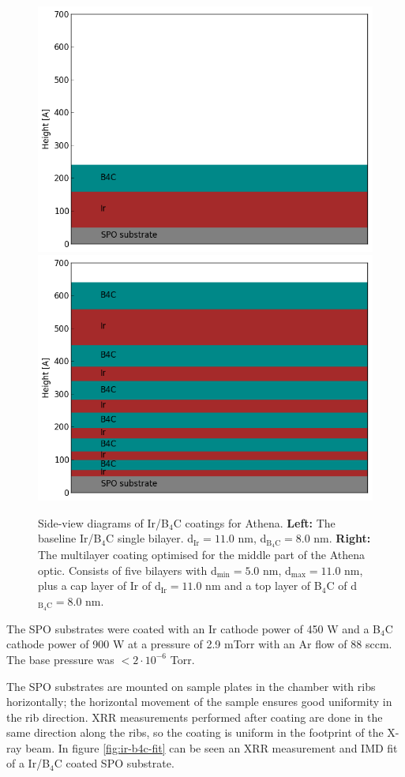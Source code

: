 \begin{figure}[!h]
  \center
\includegraphics[width=0.4\linewidth]{figures/athena/coating_on_spo/ir-b4c-baseline.png}
  \includegraphics[width=0.4\linewidth]{figures/athena/coating_on_spo/ir-b4c-ml.png}
\caption{\footnotesize Side-view diagrams of Ir/B$_4$C coatings for Athena. \textbf{Left:} The baseline Ir/B$_4$C single bilayer. d$_{\text{Ir}} = 11.0$ nm,  d$_{\text{B}_4\text{C}} = 8.0$ nm. \textbf{Right:} The multilayer coating optimised for the middle part of the Athena optic. Consists of five bilayers with d$_{\text{min}} = 5.0$ nm, d$_{\text{max}} = 11.0$ nm, plus a cap layer of Ir of d$_{\text{Ir}} = 11.0$ nm and a top layer of B$_4$C of d$_{\text{B}_4\text{C}} = 8.0$ nm. }\label{fig:ml_baseline_sideview}
\end{figure}

The SPO substrates were coated with an Ir cathode power of 450 W and a B$_4$C cathode power of 900 W at a pressure of 2.9 mTorr with an Ar flow of 88 sccm. The base pressure was $< 2\cdot10^{-6}$ Torr.

The SPO substrates are mounted on sample plates in the chamber with ribs horizontally; the horizontal movement of the sample ensures good uniformity in the rib direction. XRR measurements performed after coating are done in the same direction along the ribs, so the coating is uniform in the footprint of the X-ray beam. In figure \ref{fig:ir-b4c-fit} can be seen an XRR measurement and IMD fit of a Ir/B$_4$C coated SPO substrate.

